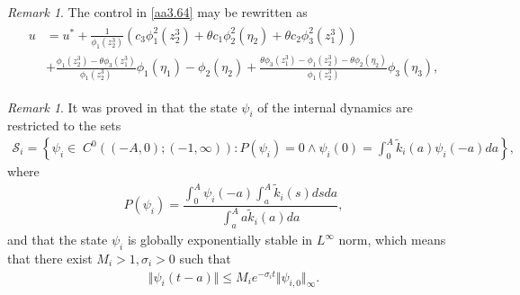 \documentclass[10pt, a4paper]{amsart}
\theoremstyle{plain}
\theoremstyle{definition}
\theoremstyle{remark}
\newtheorem{remark}[lemma]{Remark}
\numberwithin{equation}{section}
\begin{document}
\begin{remark}
The control in \eqref{aa3.64} may be rewritten as
\begin{align}
\begin{aligned}\label{equation3.61}
 u&=u^*+\frac{1}{\phi_1(z^3_2)}\left(c_{3}\phi^2_1(z^3_2)+\theta c_1\phi^2_2(\eta_2)+\theta c_2\phi^2_3(z^3_1)\right)\\
 &+\frac{\phi_1(z^3_2)-\theta\phi_3(z^3_1)}{\phi_1(z^3_2)}\phi_1(\eta_1)-\phi_2(\eta_2)+\frac{\theta\phi_3(z^3_1)-\phi_1(z^3_2)-\theta\phi_2(\eta_2)}{\phi_1(z^3_2)}\phi_3(\eta_3),
 \end{aligned}%
\end{align} 
\end{remark}
\begin{remark}
It was proved in \cite{ref69} that the state $\psi_i$ of the internal
dynamics are restricted to the sets 
\begin{align}\label{a3.61}
\mathcal{S}_i=\left\lbrace \psi_i\in\; C^0((-A,0);(-1,\infty)) : P(\psi_i)=0\wedge\psi_i(0)=\displaystyle\int_0^A\tilde{k}_i(a)\psi_i(-a)da\right\rbrace,
\end{align}
where
\begin{align*}
P(\psi_i)=\dfrac{\displaystyle\int_0^A\psi_i(-a)\displaystyle\int_a^A\tilde{k}_i(s)dsda}{\displaystyle\int_a^Aa\tilde{k}_i(a)da},
\end{align*}
and that the state $\psi_i$ is globally
exponentially stable in $L^{\infty}$ norm, which means that there exist $M_i>1,\sigma_i>0$ such that 
\begin{align}\label{aa3.65}
    \Vert\psi_i(t-a) \Vert \leq M_ie^{-\sigma_i t} \Vert\psi_{i,0} \Vert_{\infty}.
\end{align}
\end{remark}
\end{document}
